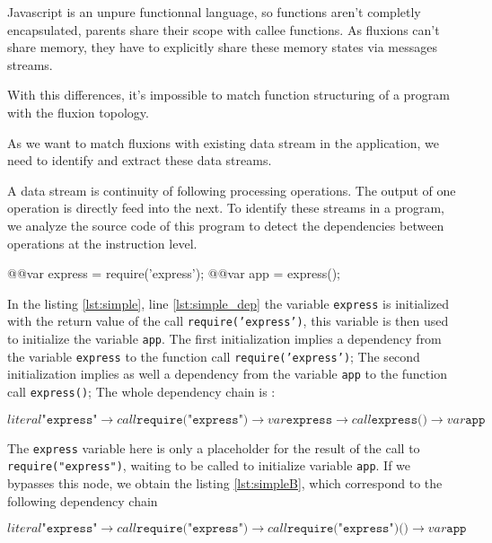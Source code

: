 Javascript is an unpure functionnal language, so functions aren't completly encapsulated, parents share their scope with callee functions.
As fluxions can't share memory, they have to explicitly share these memory states via messages streams.

With this differences, it's impossible to match function structuring of a program with the fluxion topology.

As we want to match fluxions with existing data stream in the application, we need to identify and extract these data streams.

A data stream is continuity of following processing operations.
The output of one operation is directly feed into the next.
To identify these streams in a program, we analyze the source code of this program to detect the dependencies between operations at the instruction level.

\begin{code}[Javascript, caption={Hello World example for the transformation tool},label={lst:simpleA}]
@\label{lst:simpleA_depA}@var express = require('express');
@\label{lst:simpleA_depB}@var app = express();
\end{code}

In the listing \ref{lst:simple}, line \ref{lst:simple_dep} the variable \texttt{express} is initialized with the return value of the call \texttt{require('express')}, this variable is then used to initialize the variable \texttt{app}.
The first initialization implies a dependency from the variable \texttt{express} to the function call \texttt{require('express')};
The second initialization implies as well a dependency from the variable \texttt{app} to the function call \texttt{express()};
The whole dependency chain is :
\begin{center}
$literal \texttt{"express"} \to call \texttt{require("express")} \to var \texttt{express} \to call \texttt{express()} \to var \texttt{app}$
\end{center}

The \texttt{express} variable here is only a placeholder for the result of the call to \texttt{require("express")}, waiting to be called to initialize variable \texttt{app}.
If we bypasses this node, we obtain the listing \ref{lst:simpleB}, which correspond to the following dependency chain

\begin{center}
$literal \texttt{"express"} \to call \texttt{require("express")} \to call \texttt{require("express")()} \to var \texttt{app}$
\end{center}

